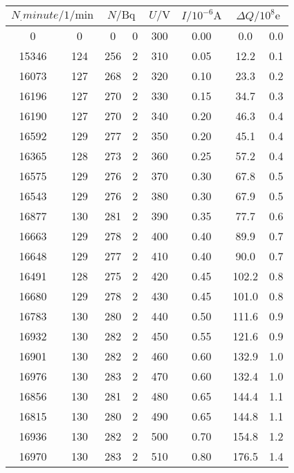 \label{tab:tab1}
	\begin{tabular}{S[table-format=5.0] @{${}\pm{}$} S[table-format=3.0]S[table-format=3.0] @{${}\pm{}$} S[table-format=1.0]S[table-format=3.0]S[table-format=1.2]S[table-format=3.1] @{${}\pm{}$} S[table-format=1.1]}
		\toprule
		 &  & {$U/\si{\volt}$} & {$I/10^{-6}\si{\ampere}$} &  \\
		 &   0 &   0 & 0 & 300 & 0.00 & 0.0 & 0.0 \\
		15346 & 124 & 256 & 2 & 310 & 0.05 & 12.2 & 0.1 \\
		16073 & 127 & 268 & 2 & 320 & 0.10 & 23.3 & 0.2 \\
		16196 & 127 & 270 & 2 & 330 & 0.15 & 34.7 & 0.3 \\
		16190 & 127 & 270 & 2 & 340 & 0.20 & 46.3 & 0.4 \\
		16592 & 129 & 277 & 2 & 350 & 0.20 & 45.1 & 0.4 \\
		16365 & 128 & 273 & 2 & 360 & 0.25 & 57.2 & 0.4 \\
		16575 & 129 & 276 & 2 & 370 & 0.30 & 67.8 & 0.5 \\
		16543 & 129 & 276 & 2 & 380 & 0.30 & 67.9 & 0.5 \\
		16877 & 130 & 281 & 2 & 390 & 0.35 & 77.7 & 0.6 \\
		16663 & 129 & 278 & 2 & 400 & 0.40 & 89.9 & 0.7 \\
		16648 & 129 & 277 & 2 & 410 & 0.40 & 90.0 & 0.7 \\
		16491 & 128 & 275 & 2 & 420 & 0.45 & 102.2 & 0.8 \\
		16680 & 129 & 278 & 2 & 430 & 0.45 & 101.0 & 0.8 \\
		16783 & 130 & 280 & 2 & 440 & 0.50 & 111.6 & 0.9 \\
		16932 & 130 & 282 & 2 & 450 & 0.55 & 121.6 & 0.9 \\
		16901 & 130 & 282 & 2 & 460 & 0.60 & 132.9 & 1.0 \\
		16976 & 130 & 283 & 2 & 470 & 0.60 & 132.4 & 1.0 \\
		16856 & 130 & 281 & 2 & 480 & 0.65 & 144.4 & 1.1 \\
		16815 & 130 & 280 & 2 & 490 & 0.65 & 144.8 & 1.1 \\
		16936 & 130 & 282 & 2 & 500 & 0.70 & 154.8 & 1.2 \\
		16970 & 130 & 283 & 2 & 510 & 0.80 & 176.5 & 1.4 \\

\end{tabular}
